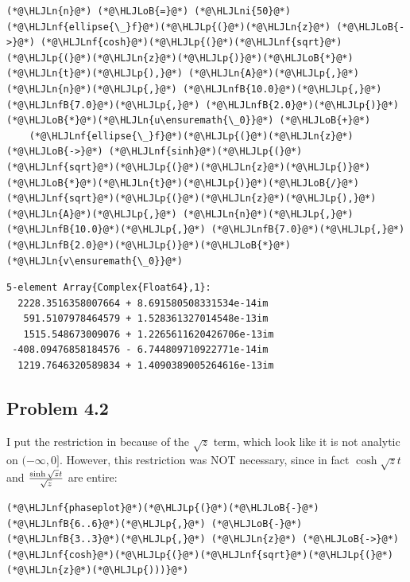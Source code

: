 \documentclass[12pt,a4paper]{article}
\newcommand{\HLJLn}[1]{#1}
\newcommand{\HLJLnf}[1]{\textcolor[RGB]{66,102,213}{#1}}
\newcommand{\HLJLnfB}[1]{\textcolor[RGB]{59,151,46}{#1}}
\newcommand{\HLJLni}[1]{\textcolor[RGB]{59,151,46}{#1}}
\newcommand{\HLJLoB}[1]{\textcolor[RGB]{102,102,102}{\textbf{#1}}}
\newcommand{\HLJLp}[1]{#1}
\begin{document}
\begin{lstlisting}
(*@\HLJLn{n}@*) (*@\HLJLoB{=}@*) (*@\HLJLni{50}@*)
(*@\HLJLnf{ellipse{\_}f}@*)(*@\HLJLp{(}@*)(*@\HLJLn{z}@*) (*@\HLJLoB{->}@*) (*@\HLJLnf{cosh}@*)(*@\HLJLp{(}@*)(*@\HLJLnf{sqrt}@*)(*@\HLJLp{(}@*)(*@\HLJLn{z}@*)(*@\HLJLp{)}@*)(*@\HLJLoB{*}@*)(*@\HLJLn{t}@*)(*@\HLJLp{),}@*) (*@\HLJLn{A}@*)(*@\HLJLp{,}@*) (*@\HLJLn{n}@*)(*@\HLJLp{,}@*) (*@\HLJLnfB{10.0}@*)(*@\HLJLp{,}@*) (*@\HLJLnfB{7.0}@*)(*@\HLJLp{,}@*) (*@\HLJLnfB{2.0}@*)(*@\HLJLp{)}@*)(*@\HLJLoB{*}@*)(*@\HLJLn{u\ensuremath{\_0}}@*) (*@\HLJLoB{+}@*)
    (*@\HLJLnf{ellipse{\_}f}@*)(*@\HLJLp{(}@*)(*@\HLJLn{z}@*) (*@\HLJLoB{->}@*) (*@\HLJLnf{sinh}@*)(*@\HLJLp{(}@*)(*@\HLJLnf{sqrt}@*)(*@\HLJLp{(}@*)(*@\HLJLn{z}@*)(*@\HLJLp{)}@*)(*@\HLJLoB{*}@*)(*@\HLJLn{t}@*)(*@\HLJLp{)}@*)(*@\HLJLoB{/}@*)(*@\HLJLnf{sqrt}@*)(*@\HLJLp{(}@*)(*@\HLJLn{z}@*)(*@\HLJLp{),}@*) (*@\HLJLn{A}@*)(*@\HLJLp{,}@*) (*@\HLJLn{n}@*)(*@\HLJLp{,}@*) (*@\HLJLnfB{10.0}@*)(*@\HLJLp{,}@*) (*@\HLJLnfB{7.0}@*)(*@\HLJLp{,}@*) (*@\HLJLnfB{2.0}@*)(*@\HLJLp{)}@*)(*@\HLJLoB{*}@*)(*@\HLJLn{v\ensuremath{\_0}}@*)
\end{lstlisting}

\begin{lstlisting}
5-element Array{Complex{Float64},1}:
  2228.3516358007664 + 8.691580508331534e-14im 
   591.5107978464579 + 1.528361327014548e-13im 
   1515.548673009076 + 1.2265611620426706e-13im
 -408.09476858184576 - 6.744809710922771e-14im 
  1219.7646320589834 + 1.4090389005264616e-13im
\end{lstlisting}


\subsection{Problem 4.2}
I put the restriction in because of the $\sqrt z$ term, which look like it is not analytic on $(-\infty,0]$. However, this restriction was NOT necessary, since in fact $\cosh \sqrt z t$ and ${\sinh \sqrt z t \over \sqrt z}$ are entire:


\begin{lstlisting}
(*@\HLJLnf{phaseplot}@*)(*@\HLJLp{(}@*)(*@\HLJLoB{-}@*)(*@\HLJLnfB{6..6}@*)(*@\HLJLp{,}@*) (*@\HLJLoB{-}@*)(*@\HLJLnfB{3..3}@*)(*@\HLJLp{,}@*) (*@\HLJLn{z}@*) (*@\HLJLoB{->}@*) (*@\HLJLnf{cosh}@*)(*@\HLJLp{(}@*)(*@\HLJLnf{sqrt}@*)(*@\HLJLp{(}@*)(*@\HLJLn{z}@*)(*@\HLJLp{)))}@*)
\end{lstlisting}
\end{document}
